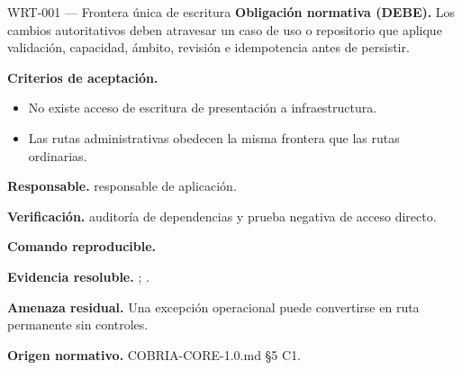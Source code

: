 \begin{requisito}{WRT-001 --- Frontera única de escritura}
\textbf{Obligación normativa (DEBE).} Los cambios autoritativos deben atravesar un caso de uso o repositorio que aplique validación, capacidad, ámbito, revisión e idempotencia antes de persistir.\par
\textbf{Criterios de aceptación.}
\begin{itemize}
\item No existe acceso de escritura de presentación a infraestructura.
\item Las rutas administrativas obedecen la misma frontera que las rutas ordinarias.
\end{itemize}
\textbf{Responsable.} responsable de aplicación.\par
\textbf{Verificación.} auditoría de dependencias y prueba negativa de acceso directo.\par
\textbf{Comando reproducible.} \texttt{}\par
\textbf{Evidencia resoluble.} ; .\par
\textbf{Amenaza residual.} Una excepción operacional puede convertirse en ruta permanente sin controles.\par
\textbf{Origen normativo.} COBRIA-CORE-1.0.md §5 C1.
\end{requisito}
